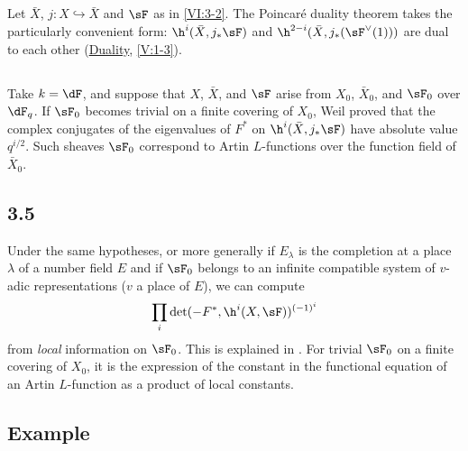 \documentclass[oneside]{book}
\begin{document}
\subsection{}\label{VI:3-3}

Let $\bar X$, $j:X\hookrightarrow\bar X$ and $\sF$ as in \ref{VI:3-2}. The 
Poincaré duality theorem takes the particularly convenient form: 
$\h^i(\bar X,j_\ast \sF)$ and $\h^{2-i}(\bar X,j_\ast(\sF^\vee(1)))$ are 
dual to each other (\hyperref[V]{Duality}, \ref{V:1-3}). 





\subsection{}\label{VI:3-4}

Take $k=\dF$, and suppose that $X$, $\bar X$, and $\sF$ arise from 
$X_0$, $\bar X_0$, and $\sF_0$ over $\dF_q$. If $\sF_0$ becomes trivial on a 
finite covering of $X_0$, Weil proved that the complex conjugates of 
the eigenvalues of $F^\ast$ on $\h^i(\bar X,j_\ast\sF)$ have absolute value 
$q^{i/2}$. Such sheaves $\sF_0$ correspond to Artin $L$-functions 
over the function field of $\bar X_0$. 





\subsection*{3.5}\label{VI:3-5_} %

Under the same hypotheses, or more generally if $E_\lambda$ is the 
completion at a place $\lambda$ of a number field $E$ and if $\sF_0$ 
belongs to an infinite compatible system of $v$-adic representations 
($v$ a place of $E$), we can compute 
\[
  \prod_i \det(-F^\ast,\h^i(X,\sF))^{(-1)^i} 
\]
from \emph{local} information on $\sF_0$. This is explained in 
\cite{de73}. For trivial $\sF_0$ on a finite covering of $X_0$, it is 
the expression of the constant in the functional equation of an Artin 
$L$-function as a product of local constants. 





\subsection{Example}\label{VI:3-5}
\end{document}
